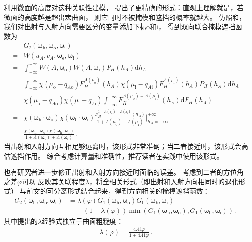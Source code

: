 \citet{Ross:10.1364/JOSAA.22.002442}利用微面的高度对这种关联性建模，
提出了更精确的形式：直观上理解就是，若微面的高度越是超出宏曲面，
则它同时不被掩模和遮挡的概率就越大。
仿照和，
我们对出射与入射方向需要区分的变量添加下标$\mathrm{o}$和$\mathrm{i}$，
得到双向联合掩模遮挡函数为
\begin{align}
    &G_2({\bm\omega}_{\mathrm{h}},{\bm\omega}_{\mathrm{o}},{\bm\omega}_{\mathrm{i}})\nonumber\\
    =&W(u_A,v_A,{\bm\omega}_{\mathrm{o}},{\bm\omega}_{\mathrm{i}})\nonumber\\
    =&\int_{-\infty}^{+\infty}W(A,{\bm\omega}_{\mathrm{o}})W(A,{\bm\omega}_{\mathrm{i}})P_H(h_A)\mathrm{d}h_A\nonumber\\
    =&\int_{-\infty}^{+\infty}\chi(\mu_{\mathrm{o}}-q_{A\mathrm{o}})F_H^{\Lambda(\mu_{\mathrm{o}})}(h_A)
    \chi(\mu_{\mathrm{i}}-q_{A\mathrm{i}})F_H^{\Lambda(\mu_{\mathrm{i}})}(h_A)P_H(h_A)\mathrm{d}h_A\nonumber\\
    =&\chi(\mu_{\mathrm{o}}-q_{A\mathrm{o}})\chi(\mu_{\mathrm{i}}-q_{A\mathrm{i}})
    \int_{-\infty}^{+\infty}F_H^{\Lambda(\mu_{\mathrm{o}})+\Lambda(\mu_{\mathrm{i}})}(h_A)\mathrm{d}F_H(h_A)\nonumber\\
    =&\chi({\bm\omega}_{\mathrm{h}}\cdot{\bm\omega}_{\mathrm{o}})\chi({\bm\omega}_{\mathrm{h}}\cdot{\bm\omega}_{\mathrm{i}})
    \frac{F_H^{1+\Lambda(\mu_{\mathrm{o}})+\Lambda(\mu_{\mathrm{i}})}(h_A)}
    {1+\Lambda(\mu_{\mathrm{o}})+\Lambda(\mu_{\mathrm{i}})}\bigg|_{h_A=-\infty}^{+\infty}\nonumber\\
    =&\frac{\chi({\bm\omega}_{\mathrm{h}}\cdot{\bm\omega}_{\mathrm{o}})\chi({\bm\omega}_{\mathrm{h}}\cdot{\bm\omega}_{\mathrm{i}})}
    {1+\Lambda({\bm\omega}_{\mathrm{o}})+\Lambda({\bm\omega}_{\mathrm{i}})}\, .
\end{align}
当出射和入射方向互相足够远离时，该形式非常准确；当二者接近时，该形式会高估遮挡作用。
综合考虑计算量和准确性，推荐读者在实践中使用该形式。

也有研究者进一步修正出射和入射方向接近时面临的误差。
\citet{10.1145/344779.344814}考虑到二者的方位角之差$\varphi$可以
反映其关联程度$\lambda$，将全相关形式（即出射和入射方向相同时的退化形式）
与前文的可分离形式结合起来，得到方向相关的掩模遮挡函数：
\begin{align}
    G_2({\bm\omega}_{\mathrm{h}},{\bm\omega}_{\mathrm{o}},{\bm\omega}_{\mathrm{i}})
    &=\lambda(\varphi)G_1({\bm\omega}_{\mathrm{h}},{\bm\omega}_{\mathrm{o}})G_1({\bm\omega}_{\mathrm{h}},{\bm\omega}_{\mathrm{i}})\nonumber\\
    &\quad +(1-\lambda(\varphi))\min(G_1({\bm\omega}_{\mathrm{h}},{\bm\omega}_{\mathrm{o}}),G_1({\bm\omega}_{\mathrm{h}},{\bm\omega}_{\mathrm{i}}))\, ,
\end{align}
其中\citet{vanGinneken:98}提出的$\lambda$经验式独立于曲面粗糙度：
\begin{align}
    \lambda(\varphi)=\frac{4.41\varphi}{1+4.41\varphi}\, .
\end{align}

